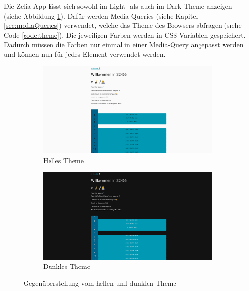 
Die Zelia App lässt sich sowohl im Light- als auch im Dark-Theme anzeigen (siehe Abbildung \ref{fig:theme}). Dafür werden Media-Queries (siehe Kapitel \ref{sec:mediaQueries}) verwendet, welche das Theme des Browsers abfragen (siehe Code \ref{code:theme}). 
Die jeweiligen Farben werden in CSS-Variablen gespeichert. Dadurch müssen die Farben nur einmal in einer Media-Query angepasst werden und können nun für jedes Element verwendet werden. 

\begin{figure}[H]
    \begin{subfigure}[c]{0.5\textwidth}
        \centering
        \includegraphics[width=\textwidth]{media/ResponsiveDesign/ZeliaDesktop.png}
        \caption{Helles Theme}
    \end{subfigure} \hfill
    \begin{subfigure}[c]{0.5\textwidth}
        \centering
        \includegraphics[width=\textwidth]{media/ResponsiveDesign/ZeliaDesktopDark.png}
        \caption{Dunkles Theme}
    \end{subfigure}
    \caption{Gegenüberstellung vom hellen und dunklen Theme}
    \label{fig:theme}
\end{figure}

